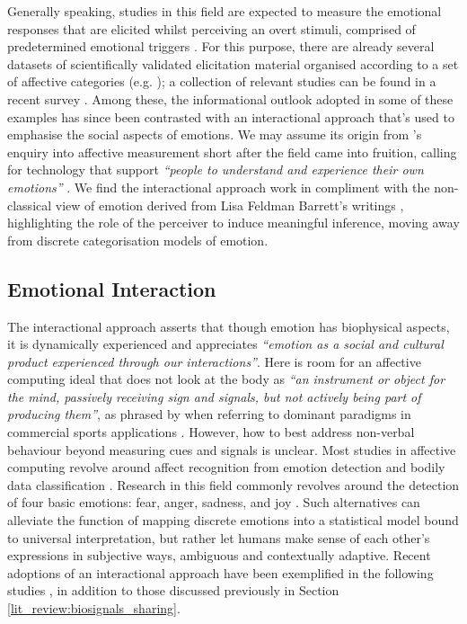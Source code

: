 Generally speaking, studies in this field are expected to measure the emotional responses that are elicited whilst perceiving an overt stimuli, comprised of predetermined emotional triggers \cite{bota_review_2019}. For this purpose, there are already several datasets of scientifically validated elicitation material organised according to a set of affective categories (e.g. \cite{yang_affective_2018,koelstra_deap_2012,bradley_affective_2007}); a collection of relevant studies can be found in a recent survey \cite{sanches_hci_2019}. Among these, the informational outlook adopted in some of these examples has since been contrasted with an interactional approach that's used to emphasise the social aspects of emotions. We may assume its origin from \citeauthor{boehner_how_2007}'s enquiry into affective measurement short after the field came into fruition, calling for technology that support \textit{``people to understand and experience their own emotions''} \cite{boehner_how_2007,boehner_affect_2005}. We find the interactional approach work in compliment with the non-classical view of emotion derived from Lisa Feldman Barrett's writings \cite{barrett_how_2017}, highlighting the role of the perceiver to induce meaningful inference, moving away from discrete categorisation models of emotion.

\subsection{Emotional Interaction}

The interactional approach asserts that though emotion has biophysical aspects, it is dynamically experienced and appreciates \textit{``emotion as a social and cultural product experienced through our interactions''}. Here is room for an affective computing ideal that does not look at the body as \textit{“an instrument or object for the mind, passively receiving sign and signals, but not actively being part of producing them”}, as phrased by \citeauthor{hook_kristina_affective_2012} when referring to dominant paradigms in commercial sports applications \cite{hook_kristina_affective_2012}. However, how to best address non-verbal behaviour beyond measuring cues and signals is unclear. Most studies in affective computing revolve around affect recognition from emotion detection and bodily data classification \cite{bota_review_2019}. Research in this field commonly revolves around the detection of four basic emotions: fear, anger, sadness, and joy \cite{picard_mit_nodate}. Such alternatives can alleviate the function of mapping discrete emotions into a statistical model bound to universal interpretation, but rather let humans make sense of each other's expressions in subjective ways, ambiguous and contextually adaptive. Recent adoptions of an interactional approach have been exemplified in the following studies \cite{sanches_ambiguity_2019,umair_thermopixels_2020,fosh_see_2013}, in addition to those discussed previously in Section \ref{lit_review:biosignals_sharing}.

